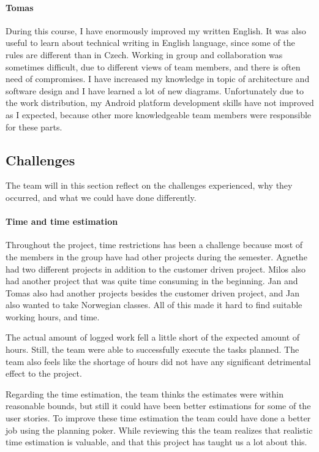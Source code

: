 \paragraph{Tomas}
During this course, I have enormously improved my written English. 
It was also useful to learn about technical writing in English language, since some of the rules are different than in Czech.
Working in group and collaboration was sometimes difficult, due to different views of team members, and there is often need of compromises.
I have increased my knowledge in topic of architecture and software design and I have learned a lot of new diagrams.
Unfortunately due to the work distribution, my Android platform development skills have not improved as I expected, because other more knowledgeable team members were responsible for these parts.

\subsection{Challenges}
The team will in this section reflect on the challenges experienced, why they occurred, and what we could have done differently.

\paragraph{Time and time estimation}

Throughout the project, time restrictions has been a challenge because most of the members in the group have had other projects during the semester. Agnethe had two different projects in addition to the customer driven project. Milos also had another project that was quite time consuming in the beginning. Jan and Tomas also had another projects besides the customer driven project, and Jan also wanted to take Norwegian classes. All of this made it hard to find suitable working hours, and time. 

The actual amount of logged work fell a little short of the expected amount of hours. Still, the team were able to successfully execute the tasks  planned. The team also feels like the shortage of hours did not have any significant detrimental effect to the project. 

Regarding the time estimation, the team thinks the estimates were within reasonable bounds, but still it could have been better estimations for some of the user stories. To improve these time estimation the team could have done a better job using the planning poker. While reviewing this the team realizes that realistic time estimation is valuable, and that this project has taught us a lot about this.

